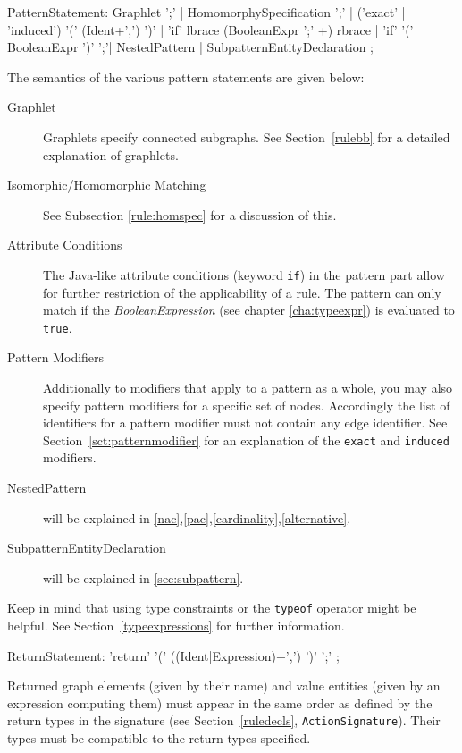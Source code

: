 \begin{rail}
  PatternStatement:
    Graphlet ';' |
    HomomorphySpecification ';' |
    ('exact' | 'induced') '(' (Ident+',') ')' |
    'if' lbrace (BooleanExpr ';' +) rbrace |
    'if' '(' BooleanExpr ')' ';'|
    NestedPattern |
    SubpatternEntityDeclaration
    ;
\end{rail}
The semantics of the various pattern statements are given below:
\begin{description}
  \item[Graphlet] Graphlets specify connected subgraphs. See Section~\ref{rulebb} for a detailed explanation of graphlets.
  \item[Isomorphic/Homomorphic Matching] See Subsection \ref{rule:homspec} for a discussion of this.
  \item[Attribute Conditions] The Java-like attribute conditions (keyword \texttt{if}) in the pattern part allow for further restriction of the applicability of a rule. The pattern can only match if the \emph{BooleanExpression} (see chapter \ref{cha:typeexpr}) is evaluated to \texttt{true}.
  \item[Pattern Modifiers] Additionally to modifiers that apply to a pattern as a whole, you may also specify pattern modifiers for a specific set of nodes. Accordingly the list of identifiers for a pattern modifier must not contain any edge identifier. See Section~\ref{sct:patternmodifier} for an explanation of the \texttt{exact} and \texttt{induced} modifiers.
  \item[NestedPattern] will be explained in \ref{nac},\ref{pac},\ref{cardinality},\ref{alternative}.
  \item[SubpatternEntityDeclaration] will be explained in \ref{sec:subpattern}.
\end{description}

Keep in mind that using type constraints or the \texttt{typeof} operator might be helpful. See Section~\ref{typeexpressions} for further information.

\begin{rail}
  ReturnStatement: 'return' '(' ((Ident|Expression)+',') ')' ';' ;
\end{rail}
Returned graph elements (given by their name) and value entities (given by an expression computing them) must appear in the same order as defined by the return types in the signature (see Section~\ref{ruledecls}, \texttt{ActionSignature}).
Their types must be compatible to the return types specified.

